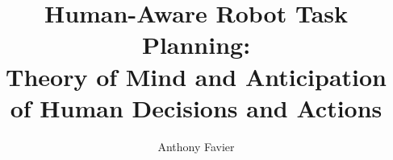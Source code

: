 %
%
%
% 
%



\title{\textbf{\large Human-Aware Robot Task Planning:\\Theory of Mind and Anticipation of Human Decisions and Actions}}
\author{Anthony Favier}

